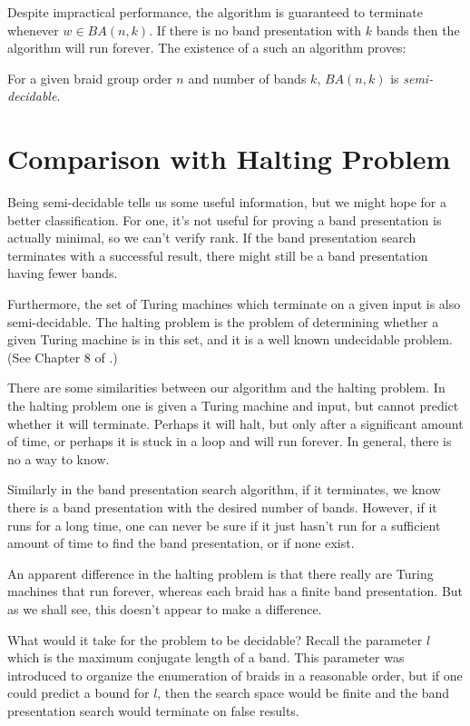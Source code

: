 \documentclass[12pt]{thesis}
\begin{document}
Despite impractical performance, the algorithm is guaranteed to terminate whenever
$w \in BA(n, k)$.
If there is no band presentation with $k$ bands
then the algorithm will run forever.
The existence of a such an algorithm proves:
\begin{proposition}
    For a given braid group order $n$ and number of bands $k$, $BA(n, k)$ is \textit{semi-decidable}.
\end{proposition}

\section{Comparison with Halting Problem}

Being semi-decidable tells us some useful information, but we might hope for a better classification.
For one, it's not useful for proving a band presentation is actually minimal,
so we can't verify rank.
If the band presentation search terminates with a successful result, there might
still be a band presentation having fewer bands.

Furthermore, the set of Turing machines which terminate on a given input is also semi-decidable.
The halting problem is the problem of determining whether a given Turing machine is in this set,
and it is a well known undecidable problem. (See Chapter 8 of \cite{computation}.)

There are some similarities between our algorithm and the halting problem.
In the halting problem one is given a Turing machine and input, but cannot predict whether it will terminate.
Perhaps it will halt, but only after a significant amount of time, or perhaps it is stuck in a loop and will run forever.
In general, there is no a way to know.

Similarly in the band presentation search algorithm, if it terminates,
we know there is a band presentation with the desired number of bands.
However, if it runs for a long time, one can never be sure if it just hasn't run for a sufficient amount
of time to find the band presentation, or if none exist.

An apparent difference in the halting problem is that there
really are Turing machines that run forever, whereas each braid
has a finite band presentation. 
But as we shall see, this doesn't appear to make a difference.

What would it take for the problem to be decidable? 
Recall the parameter $l$ which is the maximum conjugate length of a band.
This parameter was introduced to organize the enumeration of braids in a reasonable order,
but if one could predict a bound for $l$, then the search space would be finite and the band presentation search would
terminate on false results.
\end{document}
